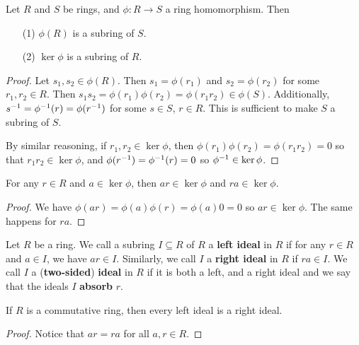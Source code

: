 \begin{lemma}\label{1.3.1}
    Let $R$ and $S$ be rings, and $\phi:R \xrightarrow{} S$ a ring homomorphism.
    Then
    \begin{enumerate}
        \item[(1)] $\phi(R)$ is a subring of $S$.

        \item[(2)] $\ker{\phi}$ is a subring of $R$.
    \end{enumerate}
\end{lemma}
\begin{proof}
    Let $s_1,s_2 \in \phi(R)$. Then $s_1=\phi(r_1)$ and $s_2=\phi(r_2)$ for some
    $r_1,r_2 \in R$. Then $s_1s_2=\phi(r_1)\phi(r_2)=\phi(r_1r_2) \in \phi(S)$.
    Additionally, $s^{-1}=\phi^{-1}(r)=\phi(r^{-1})$ for some $s \in S$,  $r
    \in R$. This is sufficient to make  $S$ a subring of  $S$.

    By similar reasoning, if $r_1,r_2 \in \ker{\phi}$, then
    $\phi(r_1)\phi(r_2)=\phi(r_1r_2)=0$ so that $r_1r_2 \in \ker{\phi}$, and
    $\phi(r^{-1})=\phi^{-1}(r)=0$ so $\phi^{-1}\in \ker{\phi}$.
\end{proof}
\begin{corollary}
    For any $r \in R$ and  $a \in \ker{\phi}$, then $ar \in \ker{\phi}$ and $ra
    \in \ker{\phi}$.
\end{corollary}
\begin{proof}
    We have $\phi(ar)=\phi(a)\phi(r)=\phi(a)0=0$ so $ar \in \ker{\phi}$. The
    same happens for $ra$.
\end{proof}

\begin{definition}
    Let $R$ be a ring. We call a subring $I \subseteq R$ of $R$ a  \textbf{left
    ideal} in $R$ if for any $r \in R$ and $a \in I$, we have  $ar \in I$.
    Similarly, we call  $I$ a  \textbf{right ideal} in $R$ if  $ra \in I$. We
    call  $I$ a  (\textbf{two-sided}) \textbf{ideal} in $R$ if it is both a
    left, and a right ideal and we say that the ideals $I$ \textbf{absorb} $r$.
\end{definition}

\begin{lemma}\label{1.3.2}
    If $R$ is a commutative ring, then every left ideal is a right ideal.
\end{lemma}
\begin{proof}
    Notice that $ar=ra$ for all  $a,r \in R$.
\end{proof}

